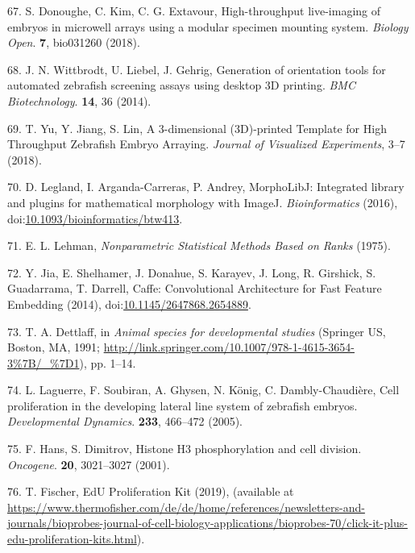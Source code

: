 \documentclass[11pt,singlespacinge,twoside]{reedthesis} %
\theoremstyle{definition}
\theoremstyle{definition}
\theoremstyle{definition}
\theoremstyle{remark}
\begin{document}
\leavevmode\hypertarget{ref-Donoughe2018}{}%
67. S. Donoughe, C. Kim, C. G. Extavour, High-throughput live-imaging of embryos in microwell arrays using a modular specimen mounting system. \emph{Biology Open}. \textbf{7}, bio031260 (2018).

\leavevmode\hypertarget{ref-Wittbrodt2014}{}%
68. J. N. Wittbrodt, U. Liebel, J. Gehrig, Generation of orientation tools for automated zebrafish screening assays using desktop 3D printing. \emph{BMC Biotechnology}. \textbf{14}, 36 (2014).

\leavevmode\hypertarget{ref-Yu2018}{}%
69. T. Yu, Y. Jiang, S. Lin, A 3-dimensional (3D)-printed Template for High Throughput Zebrafish Embryo Arraying. \emph{Journal of Visualized Experiments}, 3--7 (2018).

\leavevmode\hypertarget{ref-Legland2016}{}%
70. D. Legland, I. Arganda-Carreras, P. Andrey, MorphoLibJ: Integrated library and plugins for mathematical morphology with ImageJ. \emph{Bioinformatics} (2016), doi:\href{https://doi.org/10.1093/bioinformatics/btw413}{10.1093/bioinformatics/btw413}.

\leavevmode\hypertarget{ref-Lehman}{}%
71. E. L. Lehman, \emph{Nonparametric Statistical Methods Based on Ranks} (1975).

\leavevmode\hypertarget{ref-Jia2014}{}%
72. Y. Jia, E. Shelhamer, J. Donahue, S. Karayev, J. Long, R. Girshick, S. Guadarrama, T. Darrell, Caffe: Convolutional Architecture for Fast Feature Embedding (2014), doi:\href{https://doi.org/10.1145/2647868.2654889}{10.1145/2647868.2654889}.

\leavevmode\hypertarget{ref-Dettlaff1991}{}%
73. T. A. Dettlaff, in \emph{Animal species for developmental studies} (Springer US, Boston, MA, 1991; \url{http://link.springer.com/10.1007/978-1-4615-3654-3\%7B/_\%7D1}), pp. 1--14.

\leavevmode\hypertarget{ref-Laguerre2005a}{}%
74. L. Laguerre, F. Soubiran, A. Ghysen, N. König, C. Dambly-Chaudière, Cell proliferation in the developing lateral line system of zebrafish embryos. \emph{Developmental Dynamics}. \textbf{233}, 466--472 (2005).

\leavevmode\hypertarget{ref-Hans2001}{}%
75. F. Hans, S. Dimitrov, Histone H3 phosphorylation and cell division. \emph{Oncogene}. \textbf{20}, 3021--3027 (2001).

\leavevmode\hypertarget{ref-Fischer}{}%
76. T. Fischer, EdU Proliferation Kit (2019), (available at \url{https://www.thermofisher.com/de/de/home/references/newsletters-and-journals/bioprobes-journal-of-cell-biology-applications/bioprobes-70/click-it-plus-edu-proliferation-kits.html}).
\end{document}

